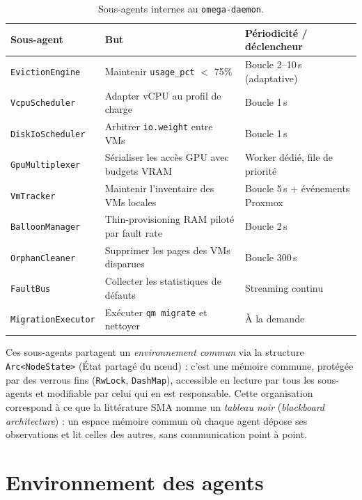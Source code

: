 \begin{table}[H]
\centering
\small
\caption{Sous-agents internes au \texttt{omega-daemon}.}
\begin{tabular}{p{3.5cm}p{4.5cm}p{5cm}}
\toprule
\textbf{Sous-agent} & \textbf{But} & \textbf{Périodicité / déclencheur} \\
\midrule
\texttt{EvictionEngine}      & Maintenir \texttt{usage\_pct} $<$ 75\%       & Boucle 2--10\,s (adaptative) \\
\texttt{VcpuScheduler}       & Adapter vCPU au profil de charge             & Boucle 1\,s \\
\texttt{DiskIoScheduler}     & Arbitrer \texttt{io.weight} entre VMs        & Boucle 1\,s \\
\texttt{GpuMultiplexer}      & Sérialiser les accès GPU avec budgets VRAM   & Worker dédié, file de priorité \\
\texttt{VmTracker}           & Maintenir l'inventaire des VMs locales       & Boucle 5\,s + événements Proxmox \\
\texttt{BalloonManager}      & Thin-provisioning RAM piloté par fault rate  & Boucle 2\,s \\
\texttt{OrphanCleaner}       & Supprimer les pages des VMs disparues        & Boucle 300\,s \\
\texttt{FaultBus}            & Collecter les statistiques de défauts        & Streaming continu \\
\texttt{MigrationExecutor}   & Exécuter \texttt{qm migrate} et nettoyer      & À la demande \\
\bottomrule
\end{tabular}
\label{tab:sous-agents}
\end{table}

Ces sous-agents partagent un \emph{environnement commun} via la structure \texttt{Arc<NodeState>} (\og{}État partagé du nœud\fg{}) : c'est une mémoire commune, protégée par des verrous fins (\texttt{RwLock}, \texttt{DashMap}), accessible en lecture par tous les sous-agents et modifiable par celui qui en est responsable. Cette organisation correspond à ce que la littérature SMA nomme un \emph{tableau noir} (\emph{blackboard architecture}) : un espace mémoire commun où chaque agent dépose ses observations et lit celles des autres, sans communication point à point.

\section{Environnement des agents}
\label{sec:sma-env}


